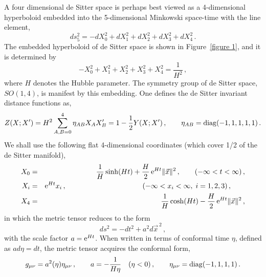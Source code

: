 \documentclass[aps,12pt,superscriptaddress,preprintnumbers,
                secnumarabic,nofootinbib,showpacs]{revtex4}
\newcommand{\lbfig}[1]{\refstepcounter{fig} \label{#1} }
\newcounter{fig}
\begin{document}
\begin{figure*}[tbp]
\vskip -0.1in
\begin{center}
\end{center}
\lbfig{figure 1}
\vskip -0.3in
\caption[fig0]{
\small
The embedding of de Sitter space into a five dimensional flat space-time.
The vertical line corresponds to the time coordinate, $X_0=T$,
and the radial coordinate $R=\sqrt{X_1^2+X_2^2+X_3^2+X_4^2}$.
 At each point $(T,R)$ there is a unit 3-sphere $S^3$, which is for
the sake of clarity represented by a circle $S^1$ erected at each
point $(T,R)$. The Hubble radius $R_H=1/H$
is the coordinate distance $R$ of the hyperboloid from the origin at $T=0$.
}
\end{figure*}
A four dimensional de  Sitter space is perhaps best viewed as a 4-dimensional
hyperboloid embedded into the 5-dimensional Minkowski space-time
with the line element,
\begin{equation}
 ds_5^2 =  - dX_0 ^2 + dX_1^2 + dX_2^2 + dX_3^2 + dX_4^2
\label{dS:5 dim}
\,.
\end{equation}
The embedded hyperboloid of de Sitter space is shown in
Figure~\ref{figure 1}, and it is determined by
\begin{equation}
\label{dS:hyperboloid}
 - X_0^2 + X_1^2 + X_2^2 + X_3^2 + X_4^2  = \frac{1}{H^2}
\,,
\end{equation}
where $H$ denotes the Hubble parameter.
The symmetry group of de Sitter space,
$SO(1,4)$, is manifest by this embedding. One defines the de Sitter
invariant distance functions as,
\begin{equation}
 Z(X;X^\prime) = H^2 \sum_{A,B=0}^4\eta_{AB}X_A X^\prime_B
               = 1 - \frac{1}{2}Y(X;X^\prime)
\,,\qquad
\eta_{AB} = {\rm diag}(-1,1,1,1,1)
\,.
\label{invariant distance}
\end{equation}
We shall use the following flat 4-dimensional coordinates (which
cover 1/2 of the de Sitter manifold),
\begin{eqnarray}
  X_0 &=& \frac{1}{H}\sinh(Ht)+\frac{H}{2}\,{\rm e}^{Ht}\|\vec x\|^2
  \,,\qquad
            (-\infty < t < \infty)\,,
\nonumber\\
 X_i &=& {\rm e}^{Ht}x_i
  \,,\qquad\qquad\qquad\qquad\qquad\quad\!\!
            (-\infty < x_i < \infty,\; i=1,2,3)\,,\qquad
\nonumber\\
 X_4 &=& \frac{1}{H}\cosh(Ht)-\frac{H}{2}\,{\rm e}^{Ht}\|\vec x\|^2
\,,
\label{dS:flat coordinates}
\end{eqnarray}
in which the metric tensor reduces to the form
\begin{equation}
ds^2 = -dt^2 + a^2d\vec{x}^{\,2}\,,
\end{equation}
with the scale factor $a={\rm e}^{Ht}$. When written in terms of
conformal time $\eta$, defined as $ad\eta = dt$, the metric tensor
acquires the conformal form,
\begin{equation}
 g_{\mu\nu} = a^2(\eta) \eta_{\mu\nu}
\,,\qquad
 a = -\frac{1}{H\eta} \quad (\eta<0)
\,,\qquad
\eta_{\mu\nu} = {\rm diag}(-1,1,1,1)
\,.
\label{dS:scale factor}
\end{equation}
\end{document}
